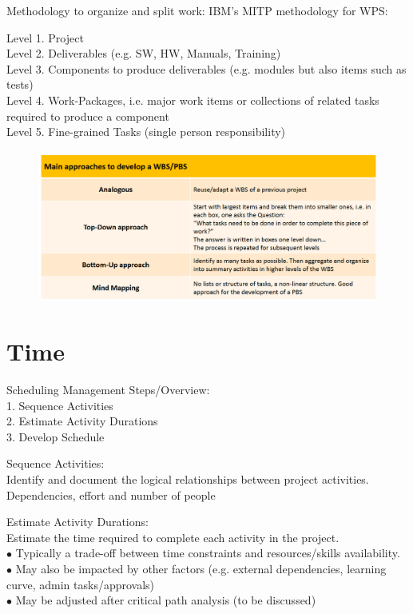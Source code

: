 \documentclass[]{project_plan}
\newcommand{\bulletPoint}{\hspace{-3.1pt}$\bullet$ \hspace{5pt}}
\begin{document}
Methodology to organize and split work: IBM’s MITP methodology for WPS:

Level 1. Project\\
Level 2. Deliverables (e.g. SW, HW, Manuals, Training)\\
Level 3. Components to produce deliverables (e.g. modules but also items such as tests)\\
Level 4. Work-Packages, i.e. major work items or collections of related tasks required to
produce a component\\
Level 5. Fine-grained Tasks (single person responsibility)

\newpage

\begin{figure}[h!]
  \centering
  \includegraphics[width=\linewidth]{approaches_to_WBS.png}
\end{figure}

\section{Time}

Scheduling Management Steps/Overview:\\
1. Sequence Activities\\
2. Estimate Activity Durations\\
3. Develop Schedule

Sequence Activities:\\
Identify and document the logical relationships between project activities.\\
Dependencies, effort and number of people

Estimate Activity Durations:\\
Estimate the time required to complete each activity in the project.\\
\bulletPoint Typically a trade-off between time constraints and resources/skills availability.\\
\bulletPoint May also be impacted by other factors (e.g. external dependencies, learning curve,
admin tasks/approvals)\\
\bulletPoint May be adjusted after critical path analysis (to be discussed)
\end{document}
